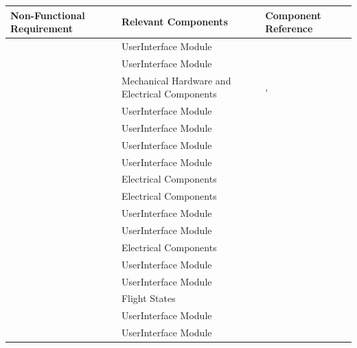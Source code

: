 \documentclass[12pt, titlepage]{article}
\begin{document}
\begin{table}[!h]
\begin{center}
\begin{tabular}{ | m{2.5cm} | m{7.5cm} | m{6.5cm} | } 
\hline
Non-Functional Requirement & Relevant Components & Component Reference \\
\hline
\nameref{USE_001} & UserInterface Module & \nameref{MIS_USER_INTERFACE} \\ \hline
\nameref{USE_002} & UserInterface Module & \nameref{MIS_USER_INTERFACE} \\ \hline
\nameref{USE_003} & Mechanical Hardware and Electrical Components & \nameref{sec:mechHardware}, \nameref{sec:elecComponents} \\ \hline
\nameref{USE_004} & UserInterface Module & \nameref{MIS_USER_INTERFACE} \\ \hline
\nameref{USE_005} & UserInterface Module & \nameref{MIS_USER_INTERFACE} \\ \hline
\nameref{SR_002} & UserInterface Module & \nameref{MIS_USER_INTERFACE} \\ \hline
\nameref{SR_003} & UserInterface Module & \nameref{MIS_USER_INTERFACE} \\ \hline
\nameref{SR_004} & Electrical Components & \nameref{sec:elecComponents} \\ \hline
\nameref{SR_005} & Electrical Components & \nameref{sec:elecComponents} \\ \hline
\nameref{SR_006} & UserInterface Module & \nameref{MIS_USER_INTERFACE} \\ \hline
\nameref{SR_007} & UserInterface Module & \nameref{MIS_USER_INTERFACE} \\ \hline
\nameref{SR_008} & Electrical Components & \nameref{sec:elecComponents} \\ \hline
\nameref{SR_009} & UserInterface Module & \nameref{MIS_USER_INTERFACE} \\ \hline
\nameref{SR_010} & UserInterface Module & \nameref{MIS_USER_INTERFACE} \\ \hline
\nameref{SR_011} & Flight States & \nameref{FlightStates} \\ \hline
\nameref{SR_012} & UserInterface Module & \nameref{MIS_USER_INTERFACE} \\ \hline
\nameref{SR_013} & UserInterface Module & \nameref{MIS_USER_INTERFACE} \\ \hline
\end{tabular}
\end{center}
\end{table}
\end{document}
